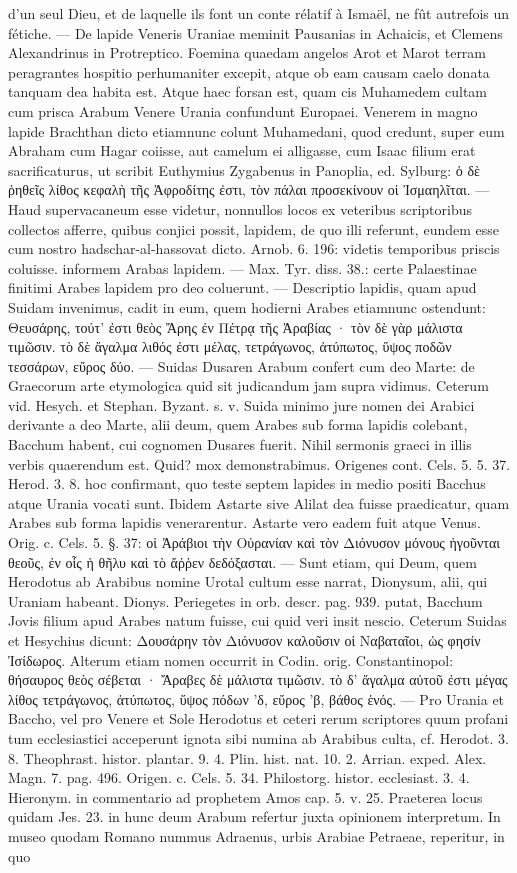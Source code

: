 \documentclass[a4paper, 11pt, oneside, polutonikogreek, german]{article}
\begin{document}
d'un seul Dieu, et de laquelle ils font un conte rélatif à Ismaël, ne fût autrefois un fétiche. --- De lapide Veneris Uraniae meminit Pausanias in Achaicis, et Clemens Alexandrinus in Protreptico. Foemina quaedam angelos Arot et Marot terram peragrantes hospitio perhumaniter excepit, atque ob eam causam caelo donata tanquam dea habita est. Atque haec forsan est, quam cis Muhamedem cultam cum prisca Arabum Venere Urania confundunt Europaei. Venerem in magno lapide Brachthan dicto etiamnunc colunt Muhamedani, quod credunt, super eum Abraham cum Hagar coiisse, aut camelum ei alligasse, cum Isaac filium erat sacrificaturus, ut scribit Euthymius Zygabenus in Panoplia, ed. Sylburg: ὁ δὲ ῥηθεῖς λίθος κεφαλὴ τῆς Ἀφροδίτης ἐστι, τὸν πάλαι προσεκίνουν οἱ Ἰσμαηλῖται. --- Haud supervacaneum esse videtur, nonnullos locos ex veteribus scriptoribus collectos afferre, quibus conjici possit, lapidem, de quo illi referunt, eundem esse cum nostro hadschar-al-hassovat dicto. Arnob. 6. 196: videtis temporibus priscis coluisse. informem Arabas lapidem. --- Max. Tyr. diss. 38.: certe Palaestinae finitimi Arabes lapidem pro deo coluerunt. --- Descriptio lapidis, quam apud Suidam invenimus, cadit in eum, quem hodierni Arabes etiamnunc ostendunt: Θευσάρης, τούτ' ἐστι θεὸς Ἄρης ἐν Πέτρᾳ τῆς Ἀραβίας · τὸν δὲ γὰρ μάλιστα τιμῶσιν. τὸ δὲ ἄγαλμα λιθός ἐστι μέλας, τετράγωνος, ἀτύπωτος, ὕψος ποδῶν τεσσάρων, εὔρος δύο. --- Suidas Dusaren Arabum confert cum deo Marte: de Graecorum arte etymologica quid sit judicandum jam supra vidimus. Ceterum vid. Hesych. et Stephan. Byzant. s. v. Suida minimo jure nomen dei Arabici derivante a deo Marte, alii deum, quem Arabes sub forma lapidis colebant, Bacchum habent, cui cognomen Dusares fuerit. Nihil sermonis graeci in illis verbis quaerendum est. Quid? mox demonstrabimus. Origenes cont. Cels. 5. 5. 37. Herod. 3. 8. hoc confirmant, quo teste septem lapides in medio positi Bacchus atque Urania vocati sunt. Ibidem Astarte sive Alilat dea fuisse praedicatur, quam Arabes sub forma lapidis venerarentur. Astarte vero eadem fuit atque Venus. Orig. c. Cels. 5. §. 37: οἱ Ἀράβιοι τὴν Οὐρανίαν καὶ τὸν Διόνυσον μόνους ἡγοῦνται θεοῦς, ἐν οἷς ἡ θῆλυ καὶ τὸ ἄῤῥεν δεδόξασται. --- Sunt etiam, qui Deum, quem Herodotus ab Arabibus nomine Urotal cultum esse narrat, Dionysum, alii, qui Uraniam habeant. Dionys. Periegetes in orb. descr. pag. 939. putat, Bacchum Jovis filium apud Arabes natum fuisse, cui quid veri insit nescio. Ceterum Suidas et Hesychius dicunt: Δουσάρην τὸν Διόνυσον καλοῦσιν οἱ Ναβαταῖοι, ὡς φησίν Ἰσίδωρος. Alterum etiam nomen occurrit in Codin. orig. Constantinopol: θήσαυρος θεὸς σέβεται · Ἄραβες δὲ μάλιστα τιμῶσιν. τὸ δ' ἄγαλμα αὐτοῦ ἐστι μέγας λίθος τετράγωνος, ἀτύπωτος, ὕψος πόδων 'δ, εὔρος 'β, βάθος ἑνός. --- Pro Urania et Baccho, vel pro Venere et Sole Herodotus et ceteri rerum scriptores quum profani tum ecclesiastici acceperunt ignota sibi numina ab Arabibus culta, cf. Herodot. 3. 8. Theophrast. histor. plantar. 9. 4. Plin. hist. nat. 10. 2. Arrian. exped. Alex. Magn. 7. pag. 496. Origen. c. Cels. 5. 34. Philostorg. histor. ecclesiast. 3. 4. Hieronym. in commentario ad prophetem Amos cap. 5. v. 25. Praeterea locus quidam Jes. 23. in hunc deum Arabum refertur juxta opinionem interpretum. In museo quodam Romano nummus Adraenus, urbis Arabiae Petraeae, reperitur, in quo 
\end{document}
